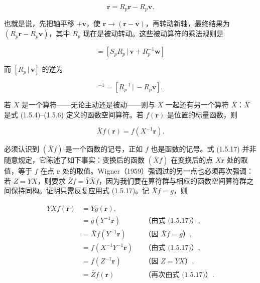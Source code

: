 \begin{equation*}
[R_{p} \,|\, \mathbf{v}]\mathbf{r} = R_{p}\mathbf{r} - R_{p}\mathbf{v}.
\tag{1.5.14}
\end{equation*}

也就是说，先把轴平移 $+\mathbf{v}$，使 $\mathbf{r} \rightarrow (\mathbf{r} - \mathbf{v})$，再转动新轴，最终结果为 $(R_{p}\mathbf{r} - R_{p}\mathbf{v})$，其中 $R_{p}$ 现在是被动转动。这些被动算符的乘法规则是

\begin{equation*}
[S_{p} \,|\, \mathbf{w}][R_{p} \,|\, \mathbf{v}] = [S_{p}R_{p} \,|\, \mathbf{v} + R_{p}^{-1}\mathbf{w}]
\tag{1.5.15}
\end{equation*}

而 $[R_{p} \,|\, \mathbf{v}]$ 的逆为

\begin{equation*}
[R_{p} \,|\, \mathbf{v}]^{-1} = [R_{p}^{-1} \,|\, -R_{p}\mathbf{v}].
\tag{1.5.16}
\end{equation*}

若 $X$ 是一个算符——无论主动还是被动——则与 $X$ 一起还有另一个算符 $\bar{X}$：$\bar{X}$ 是式 (1.5.4)--(1.5.6) 定义的函数空间算符。若 $f(\mathbf{r})$ 是位置的标量函数，则

\begin{equation*}
\bar{X}f(\mathbf{r}) = f(X^{-1}\mathbf{r}).
\tag{1.5.17}
\end{equation*}

必须认识到 $(\bar{X}f)$ 是一个函数的记号，正如 $f$ 也是函数的记号。式 (1.5.17) 并非随意规定，它陈述了如下事实：变换后的函数 $(\bar{X}f)$ 在变换后的点 $X\mathbf{r}$ 处的取值，等于 $f$ 在点 $\mathbf{r}$ 处的取值。Wigner（1959）强调过的另一点也必须再次强调：若 $Z = YX$，则要求 $\bar{Z}f = \bar{Y}\bar{X}f$，因为我们要在算符群与相应的函数空间算符群之间保持同构。证明只需反复应用式 (1.5.17)。记 $\bar{X}f = g$，则

\begin{align*}
\bar{Y}\bar{X}f(\mathbf{r}) &= \bar{Y}g(\mathbf{r}), \\
&= g(Y^{-1}\mathbf{r}) &&\text{（由式 (1.5.17)）}, \\
&= \bar{X}f(Y^{-1}\mathbf{r}) &&\text{（因 } \bar{X}f = g\text{）}, \\
&= f(X^{-1}Y^{-1}\mathbf{r}) &&\text{（由式 (1.5.17)）}, \\
&= f(Z^{-1}\mathbf{r}) &&\text{（因 } Z = YX\text{）}, \\
&= \bar{Z}f(\mathbf{r}) &&\text{（再次由式 (1.5.17)）}.
\end{align*}

